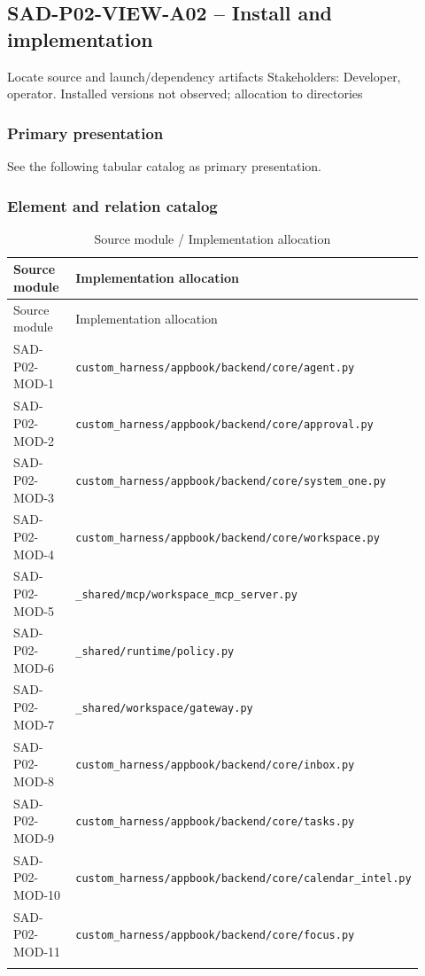 \documentclass[10pt,letterpaper]{article}
\begin{document}
\subsection{SAD-P02-VIEW-A02 -- Install and implementation}
Locate source and launch/dependency artifacts Stakeholders: Developer, operator. Installed versions not observed; allocation to directories
\subsubsection{Primary presentation}
See the following tabular catalog as primary presentation.
\subsubsection{Element and relation catalog}
\begin{longtable}{@{}>{\raggedright\arraybackslash}p{0.24\linewidth}>{\raggedright\arraybackslash}p{0.68\linewidth}@{}}
\caption{Source module / Implementation allocation}\\
\toprule Source module & Implementation allocation\\\midrule\endfirsthead
\toprule Source module & Implementation allocation\\\midrule\endhead
SAD-P02-MOD-1 & \nolinkurl{custom_harness/appbook/backend/core/agent.py}\\\addlinespace
SAD-P02-MOD-2 & \nolinkurl{custom_harness/appbook/backend/core/approval.py}\\\addlinespace
SAD-P02-MOD-3 & \nolinkurl{custom_harness/appbook/backend/core/system_one.py}\\\addlinespace
SAD-P02-MOD-4 & \nolinkurl{custom_harness/appbook/backend/core/workspace.py}\\\addlinespace
SAD-P02-MOD-5 & \nolinkurl{_shared/mcp/workspace_mcp_server.py}\\\addlinespace
SAD-P02-MOD-6 & \nolinkurl{_shared/runtime/policy.py}\\\addlinespace
SAD-P02-MOD-7 & \nolinkurl{_shared/workspace/gateway.py}\\\addlinespace
SAD-P02-MOD-8 & \nolinkurl{custom_harness/appbook/backend/core/inbox.py}\\\addlinespace
SAD-P02-MOD-9 & \nolinkurl{custom_harness/appbook/backend/core/tasks.py}\\\addlinespace
SAD-P02-MOD-10 & \nolinkurl{custom_harness/appbook/backend/core/calendar_intel.py}\\\addlinespace
SAD-P02-MOD-11 & \nolinkurl{custom_harness/appbook/backend/core/focus.py}\\\addlinespace

\end{longtable}
\end{document}
